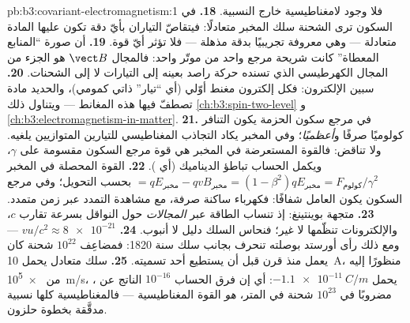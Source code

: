 \begin{solution}{pb:b3:covariant-electromagnetism:1}
فلا وجود لامغناطيسية خارج النسبية.
\textbf{18.} في السكون ترى الشحنة سلك المخبر متعادلًا: فيتقاصّ
التياران بأيّ دقة تكون عليها المادة متعادلة --- وهي معروفة
تجريبيًا بدقة مذهلة --- فلا تؤثر أيّ قوة.
\textbf{19.} أن صورة ``المنابع المعطاة'' كانت شريحة مرجع
واحد من موتّر واحد: فالمجال $\vect B$ هو الجزء من المجال
الكهرطيسي الذي تسنده حركة راصد بعينه إلى
التيارات لا إلى الشحنات.
\textbf{20.} سبين الإلكترون: فكل إلكترون مغنط أوّلي
(أي ``تيار'' ذاتي كمومي)، والحديد مادة تصطفّ فيها
هذه المغانط --- ويتناول ذلك \cref{ch:b3:spin-two-level} و
\cref{ch:b3:electromagnetism-in-matter}.
\textbf{21.} في مرجع سكون الحزمة يكون التنافر كولوميًا صرفًا
و\emph{أعظميًا}؛ وفي المخبر يكاد التجاذب المغناطيسي للتيارين
المتوازيين يلغيه. ولا تناقض: فالقوة المستعرضة في المخبر
هي قوة مرجع السكون مقسومة على $\gamma$، ويكمل الحساب
تباطؤ الديناميك (أي ).
\textbf{22.} القوة المحصلة في المخبر $= qE_{\text{مخبر}} - qvB_{\text{مخبر}} =
(1 - \beta^2)qE_{\text{مخبر}} = F_{\text{كولوم}}/\gamma^2$ بحسب
التحويل؛ وفي مرجع السكون يكون العامل شفافًا: فكهرباء ساكنة صرفة،
مع مشاهدة التمدد عبر زمن متمدد.
\textbf{23.} متجهة بوينتينغ: إذ تنساب الطاقة عبر
\emph{المجالات} حول النواقل بسرعة تقارب $c$، والإلكترونات
تنظّمها لا غير؛ فنحاس السلك دليل لا أنبوب.
\textbf{24.} $vu/c^2 \approx \num{8e-21}$ --- ومع ذلك رأى أورستد
بوصلته تنحرف بجانب سلك سنة 1820: فمضاعِف
$10^{22}$ شحنة كان يعمل منذ قرن قبل أن يستطيع أحد
تسميته.
\textbf{25.} سلك متعادل يحمل \qty{10}{A}، منظورًا إليه من \qty{e5}{m/s}،
يحمل $\qty{-1.1e-11}{C/m}$: أي إن فرق الحساب $10^{-16}$
الناتج عن ، مضروبًا في $10^{23}$ شحنة في المتر،
\emph{هو} القوة المغناطيسية --- فالمغناطيسية كلها نسبية
مدقَّقة بخطوة حلزون.
\end{solution}
